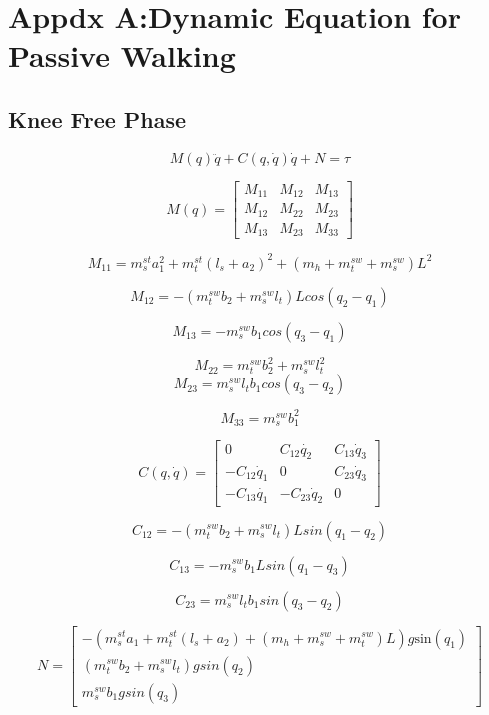 \chapter{Appdx A:Dynamic Equation for Passive Walking}

\section*{Knee Free Phase}

\[
M(q)\ddot{q}+C(q,\dot{q})\dot{q}+N=\tau\]


\[
M(q)=\left[\begin{array}{ccc}
M_{11} & M_{12} & M_{13}\\
M_{12} & M_{22} & M_{23}\\
M_{13} & M_{23} & M_{33}\end{array}\right]
\]

\[
M_{11}=m_{s}^{st}a_{1}^{2}+m_{t}^{st}(l_{s}+a_{2})^{2}+(m_{h}+m_{t}^{sw}+m_{s}^{sw})L^{2}\]


\[
M_{12}=-(m_{t}^{sw}b_{2}+m_{s}^{sw}l_{t})Lcos(q_{2}-q_{1})\]


\[
M_{13}=-m_{s}^{sw}b_{1}cos(q_{3}-q_{1})\]


\[
M_{22}=m_{t}^{sw}b_{2}^{2}+m_{s}^{sw}l_{t}^{2}\]
\[
M_{23}=m_{s}^{sw}l_{t}b_{1}cos(q_{3}-q_{2})\]


\[
M_{33}=m_{s}^{sw}b_{1}^{2}\]


\[
C(q,\dot{q})=\left[\begin{array}{ccc}
0 & C_{12}\dot{q_{2}} & C_{13}\dot{q}_{3}\\
-C_{12}\dot{q}_{1} & 0 & C_{23}\dot{q}_{3}\\
-C_{13}\dot{q_{1}} & -C_{23}\dot{q}_{2} & 0\end{array}\right]\]


\[
C_{12}=-(m_{t}^{sw}b_{2}+m_{s}^{sw}l_{t})Lsin(q_{1}-q_{2})\]


\[
C_{13}=-m_{s}^{sw}b_{1}Lsin(q_{1}-q_{3})\]


\[
C_{23}=m_{s}^{sw}l_{t}b_{1}sin(q_{3}-q_{2})\]



\[
N=\left[\begin{array}{c}
-(m_{s}^{st}a_{1}+m_{t}^{st}(l_{s}+a_{2})+(m_{h}+m_{s}^{sw}+m_{t}^{sw})L)g\mathbf{\mathrm{sin}}(q_{1})\\
(m_{t}^{sw}b_{2}+m_{s}^{sw}l_{t})gsin(q_{2})\\
m_{s}^{sw}b_{1}gsin(q_{3})\end{array}\right]\]


